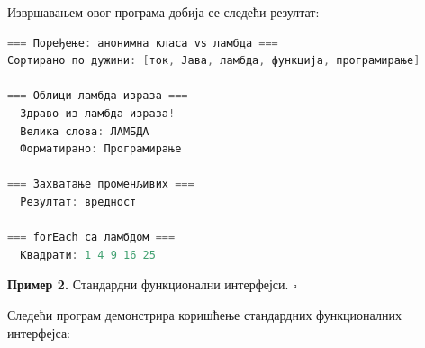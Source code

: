 Извршавањем овог програма добија се следећи резултат:

\begin{lstlisting}[language=Java]
=== Поређење: анонимна класа vs ламбда ===
Сортирано по дужини: [ток, Јава, ламбда, функција, програмирање]
 
=== Облици ламбда израза ===
  Здраво из ламбда израза!
  Велика слова: ЛАМБДА
  Форматирано: Програмирање
 
=== Захватање променљивих ===
  Резултат: вредност
 
=== forEach са ламбдом ===
  Квадрати: 1 4 9 16 25
\end{lstlisting}


\bigskip

\noindent \textbf{Пример 2.} Стандардни функционални интерфејси. $\square$

\medskip

Следећи програм демонстрира коришћење стандардних функционалних интерфејса:

